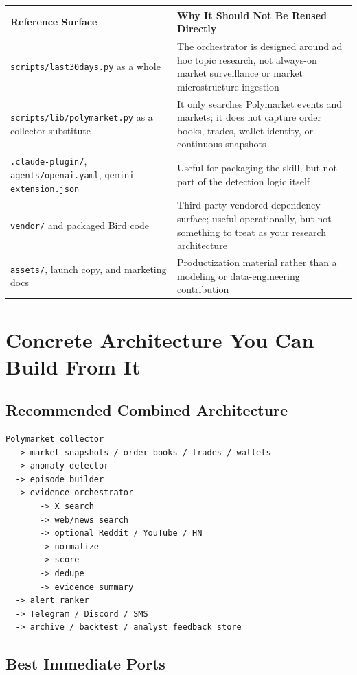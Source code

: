 \documentclass[11pt, letterpaper]{article}
\begin{document}
\begin{longtable}{p{3.6cm}p{10.2cm}}
\toprule
\textbf{Reference Surface} & \textbf{Why It Should Not Be Reused Directly} \\
\midrule
\endhead
\texttt{scripts/last30days.py} as a whole & The orchestrator is designed around ad hoc topic research, not always-on market surveillance or market microstructure ingestion \\
\texttt{scripts/lib/polymarket.py} as a collector substitute & It only searches Polymarket events and markets; it does not capture order books, trades, wallet identity, or continuous snapshots \\
\texttt{.claude-plugin/}, \texttt{agents/openai.yaml}, \texttt{gemini-extension.json} & Useful for packaging the skill, but not part of the detection logic itself \\
\texttt{vendor/} and packaged Bird code & Third-party vendored dependency surface; useful operationally, but not something to treat as your research architecture \\
\texttt{assets/}, launch copy, and marketing docs & Productization material rather than a modeling or data-engineering contribution \\
\bottomrule
\end{longtable}

\section{Concrete Architecture You Can Build From It}

\subsection{Recommended Combined Architecture}

\begin{lstlisting}[title={Recommended Combined System}]
Polymarket collector
  -> market snapshots / order books / trades / wallets
  -> anomaly detector
  -> episode builder
  -> evidence orchestrator
       -> X search
       -> web/news search
       -> optional Reddit / YouTube / HN
       -> normalize
       -> score
       -> dedupe
       -> evidence summary
  -> alert ranker
  -> Telegram / Discord / SMS
  -> archive / backtest / analyst feedback store
\end{lstlisting}

\subsection{Best Immediate Ports}
\end{document}
